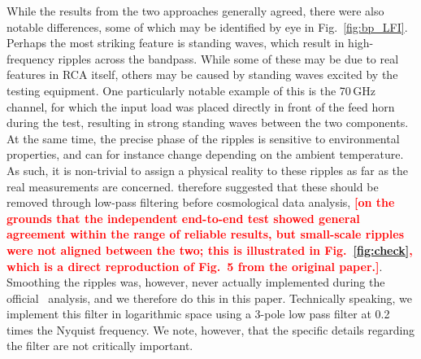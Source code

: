 \documentclass[twocolumn]{aa}
\newcommand{\?}[1]{\textcolor{red}{{\bf [#1]}}}
\begin{document}
While the results from the two approaches generally agreed, there were also
notable differences, some of which may be identified by eye in
Fig.~\ref{fig:bp_LFI}. Perhaps the most striking feature is standing waves,
which result in high-frequency ripples across the bandpass. While some of these
may be due to real features in RCA itself, others may be caused by standing
waves excited by the testing equipment. One particularly notable example of this
is the 70\,GHz channel, for which the input load was placed directly in front of
the feed horn during the test, resulting in strong standing waves between the
two components. At the same time, the precise phase of the ripples is sensitive
to environmental properties, and can for instance change depending on the
ambient temperature. As such, it is non-trivial to assign a physical reality to
these ripples as far as the real measurements are concerned. \citet{zonca2009}
therefore suggested that these should be removed through low-pass filtering
before cosmological data analysis, \?{\textbf{on the grounds that the
independent end-to-end test showed general agreement within the range of
reliable results, but small-scale ripples were not aligned between the two; this
is illustrated in Fig.~\ref{fig:check}, which is a direct reproduction of Fig.~5
from the original paper.}}. Smoothing the ripples was, however, never actually
implemented during the official \Planck\ analysis, and we therefore do this in
this paper. Technically speaking, we implement this filter in logarithmic space
using a 3-pole low pass filter at 0.2 times the Nyquist frequency. We note,
however, that the specific details regarding the filter are not critically
important.
\end{document}
